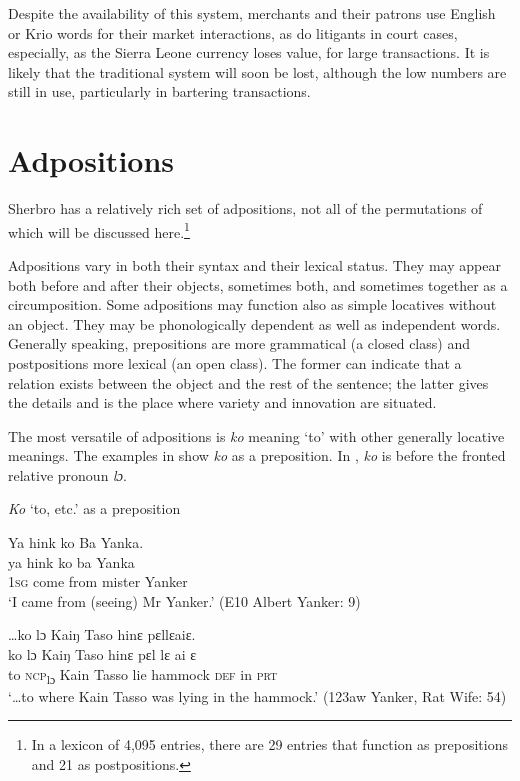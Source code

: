 Despite the availability of this system, merchants and their patrons use English or Krio words for their market interactions, as do litigants in court cases, especially, as the Sierra Leone currency loses value, for large transactions. It is likely that the traditional system will soon be lost, although the low numbers are still in use, particularly in bartering transactions.

\section{Adpositions}
\label{sec:3.8}\hypertarget{Toc115517772}{}
Sherbro has a relatively rich set of adpositions, not all of the permutations of which will be discussed here.\footnote{In a lexicon of 4,095 entries, there are 29 entries that function as prepositions and 21 as postpositions.}

Adpositions vary in both their syntax and their lexical status. They may appear both before and after their objects, sometimes both, and sometimes together as a circumposition. Some adpositions may function also as simple locatives without an object. They may be phonologically dependent as well as independent words. Generally speaking, prepositions are more grammatical (a closed class) and postpositions more lexical (an open class). The former can indicate that a relation exists between the object and the rest of the sentence; the latter gives the details and is the place where variety and innovation are situated.

The most versatile of adpositions is \textit{ko} meaning ‘to' with other generally locative meanings. The examples in  show \textit{ko} as a preposition. In , \textit{ko} is before the fronted relative pronoun \textit{lɔ}.

\ea%
    \label{ex:78}
    \textit{Ko} ‘to, etc.' as a preposition

\ea\label{ex:78a} Ya  hink ko Ba Yanka.\\
\gll ya    hink    ko     ba      Yanka\\
  1\textsc{sg}  come    from    mister  Yanker\\
  \glt ‘I came from (seeing) Mr Yanker.' (E10 Albert Yanker: 9)

\ex\label{ex:78b} …ko lɔ Kaiŋ Taso hinɛ pɛllɛaiɛ.\\
\gll ko    lɔ      Kaiŋ  Taso    hinɛ  pɛl        lɛ    ai    ɛ\\
to    \textsc{ncp}\textsubscript{lɔ}    Kain  Tasso    lie    hammock  \textsc{def}  in    \textsc{prt}\\
\glt ‘…to where Kain Tasso was lying in the hammock.' (123aw Yanker, Rat Wife: 54)
\z
\z

